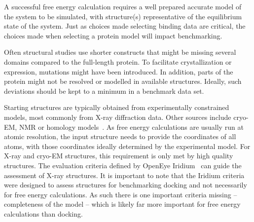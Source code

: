 \documentclass[9pt,bestpractices]{livecoms}
\begin{document}

A successful free energy calculation requires a well prepared accurate model of the system to be simulated, with structure(s) representative of the equilibrium state of the system. Just as choices made selecting binding data are critical, the choices made when selecting a protein model will impact benchmarking.

Often structural studies use shorter constructs that might be missing several domains compared to the full-length protein. To facilitate crystallization or expression, mutations might have been introduced. In addition, parts of the protein might not be resolved or modelled in available structures. Ideally, such deviations should be kept to a minimum in a benchmark data set.
%

Starting structures are typically obtained from experimentally constrained models, most commonly from X-ray diffraction data.
Other sources include cryo-EM, NMR or homology models~\cite{courniaRelativeBindingFree2017,courniaRigorousFreeEnergy2020,schindler_largescale_2020}.
As free energy calculations are usually run at atomic resolution, the input structure needs to provide the coordinates of all atoms, with those coordinates ideally determined by the experimental model.
%
For X-ray and cryo-EM structures, this requirement is only met by high quality structures.
The evaluation criteria defined by OpenEye Iridium~\cite{warrenEssentialConsiderationsUsing2012} can guide the assessment of X-ray structures. It is important to note that the Iridium criteria were designed to assess structures for benchmarking docking and not necessarily for free energy calculations. As such there is one important criteria missing -- completeness of the model -- which is likely far more important for free energy calculations than docking.
\end{document}
